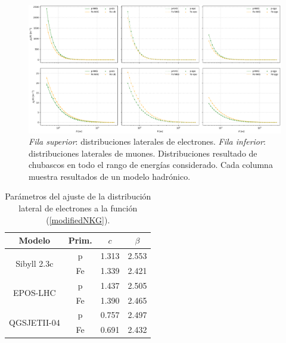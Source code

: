 \begin{figure}[ht] 
\centering
\includegraphics[width=\textwidth]{Figuras/distlat_pFe}
\caption{\textit{Fila superior}: distribuciones laterales de electrones. \textit{Fila inferior}: distribuciones laterales de muones. Distribuciones resultado de chubascos en todo el rango de energías considerado. Cada columna muestra resultados de un modelo hadrónico.}
\label{fig:distlat}
\end{figure}
		
\begin{table}[ht] 
\centering
\caption{Parámetros del ajuste de la distribución lateral de electrones a la función (\ref{modifiedNKG}).}
\begin{tabular}{c|c|cc}
Modelo                       & Prim. & $c$   & $\beta$ \\ \hline
\multirow{2}{*}{Sibyll 2.3c} & p     & 1.313 & 2.553   \\
                             & Fe    & 1.339 & 2.421   \\ \hline
\multirow{2}{*}{EPOS-LHC}    & p     & 1.437 & 2.505   \\
                             & Fe    & 1.390 & 2.465   \\ \hline
\multirow{2}{*}{QGSJETII-04} & p     & 0.757 & 2.497   \\
                             & Fe    & 0.691 & 2.432   \\ \hline
\end{tabular}
\label{edistlat_params}
\end{table}

